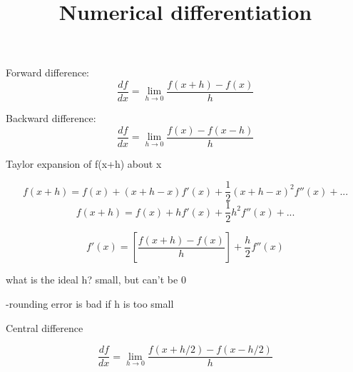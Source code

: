 \documentclass{article}
\title{Numerical differentiation}
\begin{document}
  \maketitle
  \newpage

Forward difference:
$$\frac{df}{dx} = \lim_{h \rightarrow 0} \frac{f(x+h)-f(x)}{h}$$

Backward difference:
$$\frac{df}{dx} = \lim_{h \rightarrow 0} \frac{f(x)-f(x-h)}{h}$$

Taylor expansion of f(x+h) about x

$$f(x+h) = f(x) + (x+h-x)f'(x) + \frac{1}{2}(x+h-x)^2f''(x) + ...$$
$$f(x+h) = f(x) + hf'(x) + \frac{1}{2}h^2f''(x) + ...$$

$$f'(x) = [\frac{f(x+h)-f(x)}{h}] + \frac{h}{2}f''(x)$$

what is the ideal h?
small, but can't be 0

-rounding error is bad if h is too small

\newpage

Central difference

$$\frac{df}{dx} = \lim_{h \rightarrow 0} \frac{f(x+h/2)-f(x-h/2)}{h}$$
\end{document}
